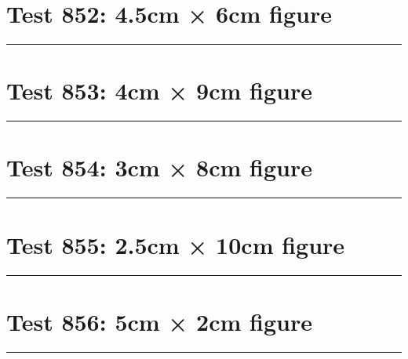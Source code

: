\documentclass[a4paper,11pt]{article}
\begin{document}
\section*{Test 852: 4.5cm × 6cm figure}
\begin{swarmwrap}%
  \begin{minipage}[t]{4cm}
    \centering
    \rule{\linewidth}{6cm}
  \end{minipage}%
\end{swarmwrap}%
\swarmwrapnext
\lipsum[107]
\lipsum[108]
\lipsum[109]
\lipsum[110]
\lipsum[111]
\lipsum[112]
\section*{Test 853: 4cm × 9cm figure}
\begin{swarmwrap}%
  \begin{minipage}[t]{4cm}
    \centering
    \rule{\linewidth}{9cm}
  \end{minipage}%
\end{swarmwrap}%
\swarmwrapnext
\lipsum[24]
\lipsum[25]
\lipsum[26]
\section*{Test 854: 3cm × 8cm figure}
\begin{swarmwrap}%
  \begin{minipage}[t]{3cm}
    \centering
    \rule{\linewidth}{8cm}
  \end{minipage}%
\end{swarmwrap}%
\swarmwrapnext
\lipsum[109]
\lipsum[110]
\lipsum[111]
\lipsum[112]
\section*{Test 855: 2.5cm × 10cm figure}
\begin{swarmwrap}%
  \begin{minipage}[t]{2cm}
    \centering
    \rule{\linewidth}{10cm}
  \end{minipage}%
\end{swarmwrap}%
\swarmwrapnext
\lipsum[141]
\lipsum[142]
\lipsum[143]
\lipsum[144]
\section*{Test 856: 5cm × 2cm figure}
\begin{swarmwrap}%
  \begin{minipage}[t]{5cm}
    \centering
    \rule{\linewidth}{2cm}
  \end{minipage}%
\end{swarmwrap}%
\swarmwrapnext
\lipsum[93]
\lipsum[94]
\lipsum[95]
\lipsum[96]
\lipsum[97]
\lipsum[98]
\end{document}
